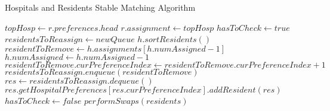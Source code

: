 \documentclass[letterpaper, 10pt,DIV=13]{scrartcl}
\numberwithin{equation}{section} %
\numberwithin{figure}{section} %
\numberwithin{table}{section} %
\begin{document}
\begin{algorithm}
    \caption{Hospitals and Residents Stable Matching Algorithm}
    \label{algorithm:variation}
    \begin{algorithmic}[1]
              \State $topHosp \gets r.preferences.head$
              \State $r.assignment \gets topHosp$ 
          \EndFor
          \State $hasToCheck \gets true$
            \State $residentsToReassign \gets new Queue$
              \State $h.sortResidents()$ 
                \State $residentToRemove \gets h.assignments[h.numAssigned - 1]$ 
                \State $h.numAssigned \gets h.numAssigned - 1$
                \State $residentToRemove.curPreferenceIndex \gets residentToRemove.curPreferenceIndex + 1$
                \State $residentsToReassign.enqueue(residentToRemove)$ 
              \EndWhile
            \EndFor
                \State $res \gets residentsToReassign.dequeue()$
                  \State $res.getHospitalPreferences[res.curPreferenceIndex].addResident(res)$ 
                \EndIf
              \EndWhile
            \Else
              \State $hasToCheck \gets false$ 
            \EndIf
          \EndWhile
          \State $performSwaps(residents)$ 
        \EndProcedure
    \end{algorithmic}
  \end{algorithm}
\end{document}
